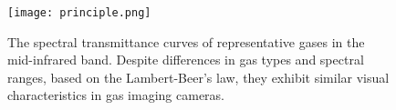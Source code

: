 \begin{figure}[t]
	\begin{center}
		\texttt{[image: principle.png]}
	\end{center}
	\vspace{-1.0em}
	\caption{The spectral transmittance curves of representative gases in the mid-infrared band. Despite differences in gas types and spectral ranges, based on the Lambert-Beer's law, they exhibit similar visual characteristics in gas imaging cameras.  }
	\label{fig:principle}
		\vspace{-0.0em}
\end{figure}